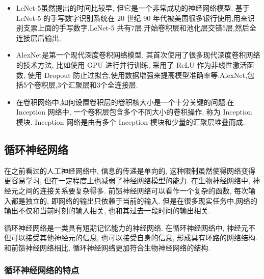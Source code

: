\begin{itemize}
\item LeNet-5虽然提出的时间比较早, 但它是一个非常成功的神经网络模型. 基于 LeNet-5 的手写数字识别系统在 20 世纪 90 年代被美国很多银行使用,用来识别支票上面的手写数字.LeNet-5 共有7层,开始卷积层和池化层交错5层,然后全连接层后输出.

\item AlexNet是第一个现代深度卷积网络模型, 其首次使用了很多现代深度卷积网络的技术方法, 比如使用 GPU 进行并行训练, 采用了 ReLU 作为非线性激活函数, 使用 Dropout 防止过拟合,使用数据增强来提高模型准确率等.AlexNet,包括5个卷积层,3个汇聚层和3个全连接层.

\item 在卷积网络中,如何设置卷积层的卷积核大小是一个十分关键的问题.在Inception 网络中, 一个卷积层包含多个不同大小的卷积操作, 称为 Inception 模块. Inception 网络是由有多个 Inception 模块和少量的汇聚层堆叠而成.
\end{itemize}







\subsection{循环神经网络\cite{Williams1989}}

在之前看过的人工神经网络中, 信息的传递是单向的, 这种限制虽然使得网络变得更容易学习, 但在一定程度上也减弱了神经网络模型的能力. 在生物神经网络中, 神经元之间的连接关系要复杂得多. 前馈神经网络可以看作一个复杂的函数, 每次输入都是独立的, 即网络的输出只依赖于当前的输入. 但是在很多现实任务中,网络的输出不仅和当前时刻的输入相关, 也和其过去一段时间的输出相关.

循环神经网络是一类具有短期记忆能力的神经网络. 在循环神经网络中, 神经元不但可以接受其他神经元的信息, 也可以接受自身的信息, 形成具有环路的网络结构. 和前馈神经网络相比, 循环神经网络更加符合生物神经网络的结构.

\subsubsection{循环神经网络的特点}

